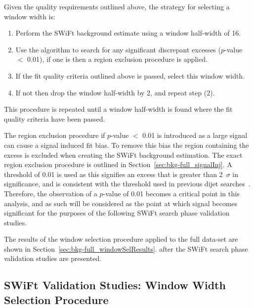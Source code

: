 \noindent
Given the quality requirements outlined above, the strategy for selecting a window width is:
\begin{enumerate}
\item Perform the SWiFt background estimate using a window half-width of 16.
\item Use the \bh{} algorithm to search for any significant discrepant excesses (\mbox{$p$-value} $<$ 0.01),
  if one is then a region exclusion procedure is applied.
\item If the fit quality criteria outlined above is passed, select this window width.
\item If not then drop the window half-width by 2, and repeat step (2).
\end{enumerate}
This procedure is repeated until a window half-width is found where the fit quality criteria have been passed.

The region exclusion procedure if \bh{} \mbox{$p$-value} $<$ 0.01 is introduced as a large signal can cause a signal induced fit bias.
To remove this bias the region containing the excess is excluded when creating the SWiFt background estimation.
The exact region exclusion procedure is outlined in Section~\ref{sec:bkg-full_signalInj}.
A threshold of 0.01 is used as this signifies an excess that is greater than 2~$\sigma$ in significance,
and is consistent with the threshold used in previous dijet searches~\cite{det-thesis_kate}.
Therefore, the observation of a \bh{} \mbox{$p$-value} of 0.01 becomes a critical point in this analysis,
and as such will be considered as the point at which signal becomes significant for the purposes of the following SWiFt search phase validation studies.

The results of the window selection procedure applied to the full data-set are shown in Section~\ref{sec:bkg-full_windowSelResults}.
after the SWiFt search phase validation studies are presented.



\subsection{SWiFt Validation Studies: Window Width Selection Procedure}
\label{sec:bkg-full_windowSelTests} 

